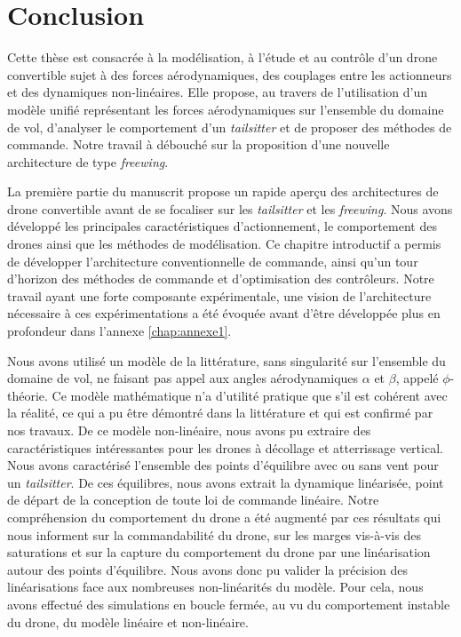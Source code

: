 \chapter*{Conclusion}

Cette thèse est consacrée à la modélisation, à l'étude et au contrôle d'un drone convertible sujet à des forces aérodynamiques, des couplages entre les actionneurs et des dynamiques non-linéaires. Elle propose, au travers de l'utilisation d'un modèle unifié représentant les forces aérodynamiques sur l'ensemble du domaine de vol, d'analyser le comportement d'un \textit{tailsitter} et de proposer des méthodes de commande. Notre travail à débouché sur la proposition d'une nouvelle architecture de type \textit{freewing}.

La première partie du manuscrit propose un rapide aperçu des architectures de drone convertible avant de se focaliser sur les \textit{tailsitter} et les \textit{freewing}. Nous avons développé les principales caractéristiques d'actionnement, le comportement des drones ainsi que les méthodes de modélisation. Ce chapitre introductif a permis de développer l'architecture conventionnelle de commande, ainsi qu'un tour d'horizon des méthodes de commande et d'optimisation des contrôleurs. Notre travail ayant une forte composante expérimentale, une vision de l'architecture nécessaire à ces expérimentations a été évoquée avant d'être développée plus en profondeur dans l'annexe \ref{chap:annexe1}.  

Nous avons utilisé un modèle de la littérature, sans singularité sur l'ensemble du domaine de vol, ne faisant pas appel aux angles aérodynamiques $\alpha$ et $\beta$, appelé $\phi$-théorie. Ce modèle mathématique n'a d'utilité pratique que s'il est cohérent avec la réalité, ce qui a pu être démontré dans la littérature et qui est confirmé par nos travaux. De ce modèle non-linéaire, nous avons pu extraire des caractéristiques intéressantes pour les drones à décollage et atterrissage vertical. 
Nous avons caractérisé l'ensemble des points d'équilibre avec ou sans vent pour un \textit{tailsitter}. De ces équilibres, nous avons extrait la dynamique linéarisée, point de départ de la conception de toute loi de commande linéaire. Notre compréhension du comportement du drone a été augmenté par ces résultats qui nous informent sur la commandabilité du drone, sur les marges vis-à-vis des saturations et sur la capture du comportement du drone par une linéarisation autour des points d'équilibre. Nous avons donc pu valider la précision des linéarisations face aux nombreuses non-linéarités du modèle. Pour cela, nous avons effectué des simulations en boucle fermée, au vu du comportement instable du drone, du modèle linéaire et non-linéaire.

